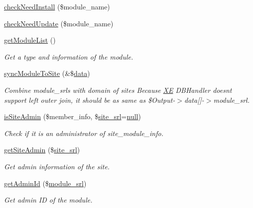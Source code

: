 \begin{DoxyCompactItemize}
\hyperlink{classmoduleModel_a0a2303f1634b4937509e9b21e811d1ad}{check\+Need\+Install} (\$module\+\_\+name)
\item 
\hyperlink{classmoduleModel_adb7f7c6facce819f69ae5e29db2018cc}{check\+Need\+Update} (\$module\+\_\+name)
\item 
\hyperlink{classmoduleModel_af51708f2ce0243f482bc92a453dd27c4}{get\+Module\+List} ()
\begin{DoxyCompactList}\small\item\em Get a type and information of the module. \end{DoxyCompactList}\item 
\hyperlink{classmoduleModel_ab51d556817682d653b92e09a34b138d6}{sync\+Module\+To\+Site} (\&\$\hyperlink{document__category_8js_a94b4f25375ac17cb917012e05bf514a7}{data})
\begin{DoxyCompactList}\small\item\em Combine module\+\_\+srls with domain of sites Because \hyperlink{namespaceXE}{XE} D\+B\+Handler doesn\textquotesingle{}t support left outer join, it should be as same as \$\+Output-\/$>$data\mbox{[}\mbox{]}-\/$>$module\+\_\+srl. \end{DoxyCompactList}\item 
\hyperlink{classmoduleModel_aae55c42d2818ffd09f81d6cb215c59ff}{is\+Site\+Admin} (\$member\+\_\+info, \$\hyperlink{ko_8install_8php_a8b1406b4ad1048041558dce6bfe89004}{site\+\_\+srl}=\hyperlink{modernizr_8min_8js_a286f9ec831c5e676eeb493248eab9575}{null})
\begin{DoxyCompactList}\small\item\em Check if it is an administrator of site\+\_\+module\+\_\+info. \end{DoxyCompactList}\item 
\hyperlink{classmoduleModel_a6baa2faf83fc96fba51072276c9cb7c3}{get\+Site\+Admin} (\$\hyperlink{ko_8install_8php_a8b1406b4ad1048041558dce6bfe89004}{site\+\_\+srl})
\begin{DoxyCompactList}\small\item\em Get admin information of the site. \end{DoxyCompactList}\item 
\hyperlink{classmoduleModel_a302d180d2acef6331f9123d60f76c8c1}{get\+Admin\+Id} (\$\hyperlink{ko_8install_8php_a370bb6450fab1da3e0ed9f484a38b761}{module\+\_\+srl})
\begin{DoxyCompactList}\small\item\em Get admin ID of the module. \end{DoxyCompactList}\item 

\end{DoxyCompactItemize}
